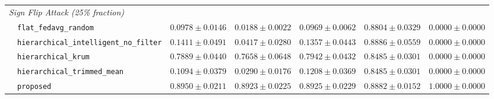 \begin{table}[t]
\begin{tabular}{llccccc}
\multicolumn{7}{l}{\textit{Sign Flip Attack (25\% fraction)}} \\
 & \texttt{flat\_fedavg\_random} & $0.0978 \pm 0.0146$ & $0.0188 \pm 0.0022$ & $0.0969 \pm 0.0062$ & $0.8804 \pm 0.0329$ & $0.0000 \pm 0.0000$ \\
 & \texttt{hierarchical\_intelligent\_no\_filter} & $0.1411 \pm 0.0491$ & $0.0417 \pm 0.0280$ & $0.1357 \pm 0.0443$ & $0.8886 \pm 0.0559$ & $0.0000 \pm 0.0000$ \\
 & \texttt{hierarchical\_krum} & $0.7889 \pm 0.0440$ & $0.7658 \pm 0.0648$ & $0.7942 \pm 0.0432$ & $0.8485 \pm 0.0301$ & $0.0000 \pm 0.0000$ \\
 & \texttt{hierarchical\_trimmed\_mean} & $0.1094 \pm 0.0379$ & $0.0290 \pm 0.0176$ & $0.1208 \pm 0.0369$ & $0.8485 \pm 0.0301$ & $0.0000 \pm 0.0000$ \\
 & \texttt{proposed} & $0.8950 \pm 0.0211$ & $0.8923 \pm 0.0225$ & $0.8925 \pm 0.0229$ & $0.8882 \pm 0.0152$ & $1.0000 \pm 0.0000$ \\
\bottomrule
\end{tabular}
\end{table}
